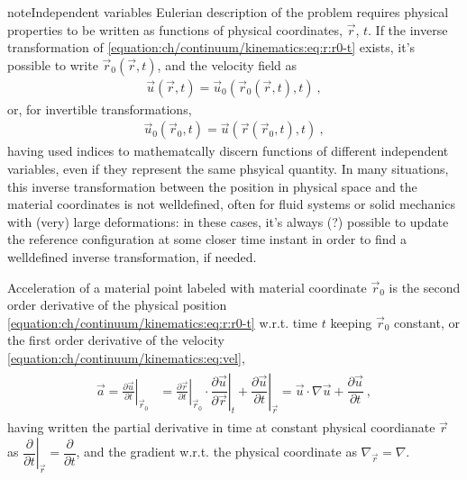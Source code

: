 \documentclass[letterpaper,10pt,english]{jupyterBook}
\begin{document}
\begin{sphinxadmonition}{note}{Independent variables}
\sphinxAtStartPar
Eulerian description of the problem requires physical properties to be written as functions of physical coordinates, \(\vec{r}\), \(t\). If the inverse transformation of \eqref{equation:ch/continuum/kinematics:eq:r:r0-t} exists, it’s possible to write \(\vec{r}_0\left(\vec{r}, t\right)\), and the velocity field as
\begin{equation*}
\begin{split}\vec{u}\left( \vec{r}, t\right) = \vec{u}_0\left( \vec{r}_0\left(\vec{r}, t\right), t\right) \ , \end{split}
\end{equation*}
\sphinxAtStartPar
or, for invertible transformations,
\begin{equation*}
\begin{split}\vec{u}_0\left( \vec{r}_0, t\right) = \vec{u}\left( \vec{r}\left(\vec{r}_0, t\right), t\right) \ , \end{split}
\end{equation*}
\sphinxAtStartPar
having used indices to mathematcally discern functions of different independent variables, even if they represent the same phsyical quantity. In many situations, this inverse transformation between the position in physical space and the material coordinates is not well\sphinxhyphen{}defined, often for fluid systems or solid mechanics with (very) large deformations: in these cases, it’s always (?) possible to update the reference configuration at some closer time instant in order to find a well\sphinxhyphen{}defined inverse transformation, if needed.
\end{sphinxadmonition}

\sphinxAtStartPar
{} Acceleration of a material point labeled with material coordinate \(\vec{r}_0\) is the second order derivative of the physical position \eqref{equation:ch/continuum/kinematics:eq:r:r0-t} w.r.t. time \(t\) keeping \(\vec{r}_0\) constant, or the first order derivative of the velocity \eqref{equation:ch/continuum/kinematics:eq:vel},
\begin{equation*}
\begin{split}\begin{aligned}
  \vec{a} = \left.\frac{\partial \vec{u}}{\partial t}\right|_{\vec{r}_0}
   & = \left.\frac{\partial \vec{r}}{\partial t}\right|_{\vec{r}_0} \cdot \left.\dfrac{\partial \vec{u}}{\partial \vec{r}}\right|_{t} + \left.\dfrac{\partial \vec{u}}{\partial t}\right|_{\vec{r}}   
     = \vec{u} \cdot \nabla \vec{u} + \dfrac{\partial \vec{u}}{\partial t} \ , 
\end{aligned}\end{split}
\end{equation*}
\sphinxAtStartPar
having written the partial derivative in time at constant physical coordianate \(\vec{r}\) as \(\left.\dfrac{\partial }{\partial t}\right|_{\vec{r}} = \dfrac{\partial}{\partial t}\), and the gradient w.r.t. the physical coordinate as \(\nabla_{\vec{r}} = \nabla\).
\end{document}

